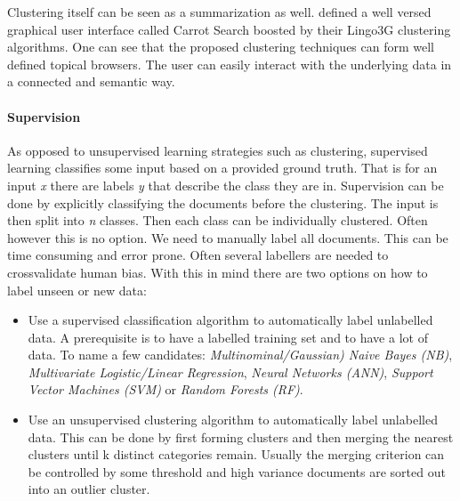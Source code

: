   Clustering itself can be seen as a summarization as well. \cite{Carrot2Search2003} defined a well versed graphical user interface called Carrot Search boosted by their Lingo3G clustering algorithms. One can see that the proposed clustering techniques can form well defined topical browsers. The user can easily interact with the underlying data in a connected and semantic way.

  \paragraph{Supervision}

    As opposed to unsupervised learning strategies such as clustering, supervised learning classifies some input based on a provided ground truth. That is for an input \emph{x} there are labels \emph{y} that describe the class they are in. Supervision can be done by explicitly classifying the documents before the clustering. The input is then split into \emph{n} classes. Then each class can be individually clustered. Often however this is no option. We need to manually label all documents. This can be time consuming and error prone. Often several labellers are needed to crossvalidate human bias.
    With this in mind there are two options on how to label unseen or new data:

      \begin{itemize}
        \item Use a supervised classification algorithm to automatically label unlabelled data. A prerequisite is to have a labelled training set and to have a lot of data. To name a few candidates: \emph{Multinominal/Gaussian) Naive Bayes (NB)}, \emph{Multivariate Logistic/Linear Regression}, \emph{Neural Networks (ANN)}, \emph{Support Vector Machines (SVM)} or \emph{Random Forests (RF)}. \cite{BishopML}
        \item Use an unsupervised clustering algorithm to automatically label unlabelled data. This can be done by first forming clusters and then merging the nearest clusters until k distinct categories remain. Usually the merging criterion can be controlled by some threshold and high variance documents are sorted out into an outlier cluster.
      \end{itemize}

